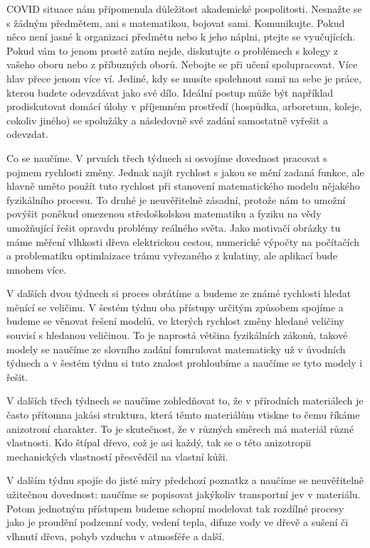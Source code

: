 \documentclass[12pt]{article}
\begin{document}
COVID situace nám připomenula důležitost akademické pospolitosti. Nesnažte se s žádným předmětem, ani s matematikou, bojovat sami. Komunikujte. Pokud něco není jasné k organizaci předmětu nebo  k jeho náplni, ptejte se vyučujících. Pokud vám to jenom prostě zatím nejde, diskutujte o problémech s kolegy z vašeho oboru nebo z příbuzných oborů. Nebojte se při učení spolupracovat. Více hlav přece jenom více ví. Jediné, kdy se musíte spolehnout sami na sebe je práce, kterou budete odevzdávat jako své dílo. Ideální postup může být například prodiskutovat domácí úlohy v příjemném prostředí (hospůdka, arboretum, koleje, cokoliv jiného) se spolužáky a následovně své zadání samostatně vyřešit a odevzdat.


Co se naučíme. V prvních třech týdnech si osvojíme dovednost pracovat s pojmem rychlosti změny. Jednak najít rychlost s jakou se mění zadaná funkce, ale hlavně uměto použít tuto rychlost při stanovení matematického modelu nějakého fyzikálního procesu. To druhé je neuvěřitelně zásadní, protože nám to umožní povýšit poněkud omezenou středoškolskou matematiku a fyziku na vědy umožňující řešit opravdu problémy reálného světa. Jako motivačí obrázky tu máme měření vlhkosti dřeva elektrickou cestou, numerické výpočty na počítačích a problematiku optimlaizace trámu vyřezaného z kulatiny, ale aplikací bude mnohem více.

V dalších dvou týdnech si proces obrátíme a budeme ze známé rychlosti hledat měnící se veličinu. V šestém týdnu  oba přístupy určitým způsobem spojíme a budeme se věnovat řešení modelů, ve kterých rychlost změny hledané veličiny souvisí s hledanou veličinou. To je naprostá většina fyzikálních zákonů, takové modely se naučíme ze slovního zadání fomrulovat matematicky už v úvodních týdnech a v šestém týdnu si tuto znalost prohloubíme a naučíme se tyto modely i řešit.

V dalších třech týdnech se naučíme zohledňovat to, že v přírodních materiálech je často přítomna jakási struktura, která těmto materiálům vtiskne to čemu říkáme anizotroní charakter. To je skutečnost, že v různých směrech má materiál různé vlastnosti. Kdo štípal dřevo, což je asi každý, tak se o této anizotropii mechanických vlastností přesvědčil na vlastní kůži.

V dalším týdnu spojíe do jisté míry předchozí poznatkz a naučíme se neuvěřitelně užitečnou dovednost: naučíme se popisovat jakýkoliv transportní jev v materiálu. Potom jednotným přístupem budeme schopní modelovat tak rozdílné procesy jako je proudění podzemní vody, vedení tepla, difuze vody ve dřevě a sušení či vlhnutí dřeva, pohyb vzduchu v atmosféře a další.
\end{document}
